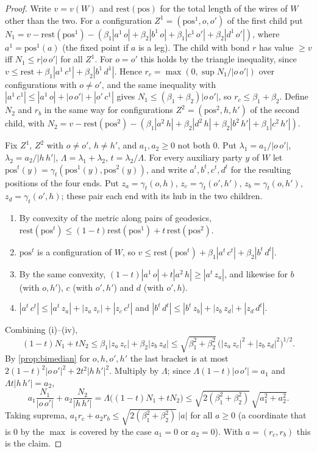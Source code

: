 \documentclass[10pt]{amsart}
\theoremstyle{plain}
\theoremstyle{definition}
\theoremstyle{remark}
\numberwithin{equation}{section}
\newcommand{\dd}[2]{|#1\,#2|}
\begin{document}
\begin{proof}
Write $v=v(W)$ and $\mathrm{rest}(\mathrm{pos})$ for the total length of the wires of $W$ other than the
two. For a configuration $Z^1=(\mathrm{pos}^1,o,o')$ of the first child put
$N_1=v-\mathrm{rest}(\mathrm{pos}^1)-(\beta_1\dd{a^1}o+\beta_2\dd{b^1}o+\beta_1\dd{c^1}{o'}+\beta_2\dd{d^1}{o'})$,
where $a^1=\mathrm{pos}^1(a)$ (the fixed point if $a$ is a leg). The child with bond $r$ has value
$\ge v$ iff $N_1\le r\dd o{o'}$ for all $Z^1$. For $o=o'$ this holds by the triangle inequality, since
$v\le\mathrm{rest}+\beta_1\dd{a^1}{c^1}+\beta_2\dd{b^1}{d^1}$. Hence $r_c=\max(0,\sup N_1/\dd o{o'})$ over
configurations with $o\ne o'$, and the same inequality with $\dd{a^1}{c^1}\le\dd{a^1}o+\dd o{o'}+\dd{o'}{c^1}$
gives $N_1\le(\beta_1+\beta_2)\dd o{o'}$, so $r_c\le\beta_1+\beta_2$. Define $N_2$ and $r_b$ in the same way
for configurations $Z^2=(\mathrm{pos}^2,h,h')$ of the second child, with
$N_2=v-\mathrm{rest}(\mathrm{pos}^2)-(\beta_1\dd{a^2}h+\beta_2\dd{d^2}h+\beta_2\dd{b^2}{h'}+\beta_1\dd{c^2}{h'})$.

Fix $Z^1$, $Z^2$ with $o\ne o'$, $h\ne h'$, and $a_1,a_2\ge0$ not both $0$. Put $\lambda_1=a_1/\dd o{o'}$,
$\lambda_2=a_2/\dd h{h'}$, $\Lambda=\lambda_1+\lambda_2$, $t=\lambda_2/\Lambda$. For every auxiliary party $y$ of
$W$ let $\mathrm{pos}^t(y)=\gamma_t(\mathrm{pos}^1(y),\mathrm{pos}^2(y))$, and write $a^t,b^t,c^t,d^t$ for the
resulting positions of the four ends. Put $z_a=\gamma_t(o,h)$, $z_c=\gamma_t(o',h')$, $z_b=\gamma_t(o,h')$,
$z_d=\gamma_t(o',h)$; these pair each end with its hub in the two children.
\begin{enumerate}[label=(\roman*)]
\item By convexity of the metric along pairs of geodesics, $\mathrm{rest}(\mathrm{pos}^t)\le(1-t)\mathrm{rest}(\mathrm{pos}^1)
+t\,\mathrm{rest}(\mathrm{pos}^2)$.
\item $\mathrm{pos}^t$ is a configuration of $W$, so $v\le\mathrm{rest}(\mathrm{pos}^t)+\beta_1\dd{a^t}{c^t}+\beta_2\dd{b^t}{d^t}$.
\item By the same convexity, $(1-t)\dd{a^1}o+t\dd{a^2}h\ge\dd{a^t}{z_a}$, and likewise for $b$ (with $o,h'$),
$c$ (with $o',h'$) and $d$ (with $o',h$).
\item $\dd{a^t}{c^t}\le\dd{a^t}{z_a}+\dd{z_a}{z_c}+\dd{z_c}{c^t}$ and
$\dd{b^t}{d^t}\le\dd{b^t}{z_b}+\dd{z_b}{z_d}+\dd{z_d}{d^t}$.
\end{enumerate}
Combining (i)--(iv),
\[
(1-t)N_1+tN_2\le\beta_1\dd{z_a}{z_c}+\beta_2\dd{z_b}{z_d}\le\sqrt{\beta_1^2+\beta_2^2}\,
\bigl(\dd{z_a}{z_c}^2+\dd{z_b}{z_d}^2\bigr)^{1/2}.
\]
By \cref{prop:bimedian} for $o,h,o',h'$ the last bracket is at most $2(1-t)^2\dd o{o'}^2+2t^2\dd h{h'}^2$.
Multiply by $\Lambda$; since $\Lambda(1-t)\dd o{o'}=a_1$ and $\Lambda t\dd h{h'}=a_2$,
\[
a_1\frac{N_1}{\dd o{o'}}+a_2\frac{N_2}{\dd h{h'}}=\Lambda\bigl((1-t)N_1+tN_2\bigr)\le\sqrt{2(\beta_1^2+\beta_2^2)}\,
\sqrt{a_1^2+a_2^2}.
\]
Taking suprema, $a_1r_c+a_2r_b\le\sqrt{2(\beta_1^2+\beta_2^2)}\,|a|$ for all $a\ge0$ (a coordinate that is
$0$ by the $\max$ is covered by the case $a_1=0$ or $a_2=0$). With $a=(r_c,r_b)$ this is the claim.
\end{proof}
\end{document}
